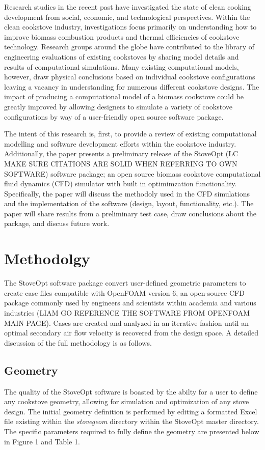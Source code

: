 \documentclass[3p,times,twocolumn]{elsarticle}
\begin{document}
Research studies in the recent past have investigated the state of clean cooking development from social, economic, and technological perspectives. Within the clean cookstove industry, investigations focus primarily on understanding how to improve biomass combustion products and thermal efficiencies of cookstove technology. Research groups around the globe have contributed to the library of engineering evaluations of existing cookstoves by sharing model details and results of computational simulations. Many existing computational models, however, draw physical conclusions based on individual cookstove configurations leaving a vacancy in understanding for numerous different cookstove designs. The impact of producing a computational model of a biomass cookstove could be greatly improved by allowing designers to simulate a variety of cookstove configurations by way of a user-friendly open source software package. 

The intent of this research is, first, to provide a review of existing computational modelling and software development efforts within the cookstove industry. Additionally, the paper presents a preliminary release of the StoveOpt (LC MAKE SURE CITATIONS ARE SOLID WHEN REFERRING TO OWN SOFTWARE) software package; an open source biomass cookstove computational fluid dynamics (CFD) simulator with built in optimimzation functionality. Specifically, the paper will discuss the methodoly used in the CFD simulations and the implementation of the software (design, layout, functionality, etc.). The paper will share results from a preliminary test case, draw conclusions about the package, and discuss future work.

\section{Methodolgy}
The StoveOpt software package convert user-defined geometric parameters to create case files compatible with OpenFOAM version 6, an open-source CFD package commonly used by engineers and scientists within academia and various industries (LIAM GO REFERENCE THE SOFTWARE FROM OPENFOAM MAIN PAGE). Cases are created and analyzed in an iterative fashion until an optimal secondary air flow velocity is recovered from the design space. A detailed discussion of the full methodology is as follows.   

\subsection{Geometry}
The quality of the StoveOpt software is boasted by the abilty for a user to define any cookstove geometry, allowing for simulation and optimization of any stove design. The initial geometry definition is performed by editing a formatted Excel file existing within the \textit{stovegeom} directory within the StoveOpt master directory. The specific parameters required to fully define the geometry are presented below in Figure 1 and Table 1.
\end{document}
